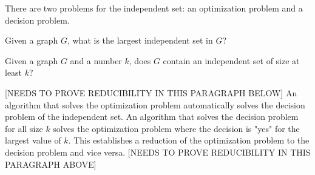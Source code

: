There are two problems for the independent set: an optimization problem and a decision problem.
\begin{prob}
Given a graph $G$, what is the largest independent set in $G$?
\end{prob}
\begin{prob}
Given a graph $G$ and a number $k$, does $G$ contain an independent set of size at least $k$?
\end{prob}
[NEEDS TO PROVE REDUCIBILITY IN THIS PARAGRAPH BELOW]
An algorithm that solves the optimization problem automatically solves the decision problem of the 
independent set.  An algorithm that solves the decision problem for all size $k$ solves the 
optimization problem where the decision is "yes" for the largest value of $k$.  This establishes a 
reduction of the optimization problem to the decision problem and vice versa. 
[NEEDS TO PROVE REDUCIBILITY IN THIS PARAGRAPH ABOVE]



